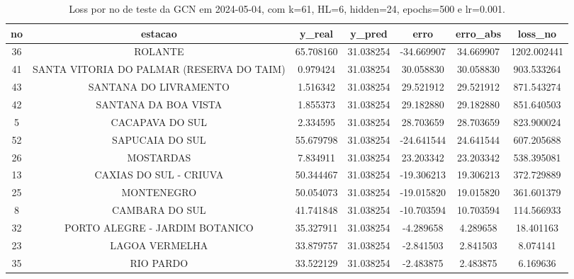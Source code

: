 \begin{table}[h]
\centering
\caption{Loss por no de teste da GCN em 2024-05-04, com k=61, HL=6, hidden=24, epochs=500 e lr=0.001.}
\label{tab:gcn_loss_k61_hl6_h24_e500_d20240504}
\begin{tabular}{ccccccc}
\toprule
no & estacao & y\_real & y\_pred & erro & erro\_abs & loss\_no \\
\midrule
36 & ROLANTE & 65.708160 & 31.038254 & -34.669907 & 34.669907 & 1202.002441 \\
41 & SANTA VITORIA DO PALMAR (RESERVA DO TAIM) & 0.979424 & 31.038254 & 30.058830 & 30.058830 & 903.533264 \\
43 & SANTANA DO LIVRAMENTO & 1.516342 & 31.038254 & 29.521912 & 29.521912 & 871.543274 \\
42 & SANTANA DA BOA VISTA & 1.855373 & 31.038254 & 29.182880 & 29.182880 & 851.640503 \\
5 & CACAPAVA DO SUL & 2.334595 & 31.038254 & 28.703659 & 28.703659 & 823.900024 \\
52 & SAPUCAIA DO SUL & 55.679798 & 31.038254 & -24.641544 & 24.641544 & 607.205688 \\
26 & MOSTARDAS & 7.834911 & 31.038254 & 23.203342 & 23.203342 & 538.395081 \\
13 & CAXIAS DO SUL - CRIUVA & 50.344467 & 31.038254 & -19.306213 & 19.306213 & 372.729889 \\
25 & MONTENEGRO & 50.054073 & 31.038254 & -19.015820 & 19.015820 & 361.601379 \\
8 & CAMBARA DO SUL & 41.741848 & 31.038254 & -10.703594 & 10.703594 & 114.566933 \\
32 & PORTO ALEGRE - JARDIM BOTANICO & 35.327911 & 31.038254 & -4.289658 & 4.289658 & 18.401163 \\
23 & LAGOA VERMELHA & 33.879757 & 31.038254 & -2.841503 & 2.841503 & 8.074141 \\
35 & RIO PARDO & 33.522129 & 31.038254 & -2.483875 & 2.483875 & 6.169636 \\
\bottomrule
\end{tabular}
\end{table}
